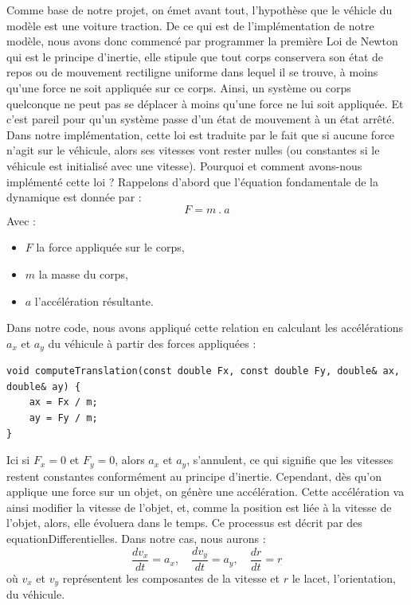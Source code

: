 Comme base de notre projet, on émet avant tout, l'hypothèse que le véhicle du modèle est une voiture traction.
De ce qui est de l'implémentation de notre modèle, nous avons donc commencé par programmer la première Loi de Newton qui est le principe d'inertie, elle stipule que tout corps conservera son état de repos ou de mouvement rectiligne uniforme dans lequel il se trouve, à moins qu'une force ne soit appliquée sur ce corps.
Ainsi, un système ou corps quelconque ne peut pas se déplacer à moins qu'une force ne lui soit appliquée.
Et c'est pareil pour qu'un système passe d'un état de mouvement à un état arrêté.
Dans notre implémentation, cette loi est traduite par le fait que si aucune force n'agit sur le véhicule, alors ses vitesses vont rester nulles (ou constantes si le véhicule est initialisé avec une vitesse).
Pourquoi et comment avons-nous implémenté cette loi ?
Rappelons d'abord que l'équation fondamentale de la dynamique est donnée par :
$$F = m \ .\  a$$
Avec :
\begin{itemize}
    \item $F$ la force appliquée sur le corps,
    \item $m$ la masse du corps,
    \item $a$ l'accélération résultante.
\end{itemize}

Dans notre code, nous avons appliqué cette relation en calculant les accélérations $a_x$ et $a_y$ du véhicule à partir des forces appliquées :


\begin{lstlisting}[style=CStyle,label={lst:void_computeTranslation}]
void computeTranslation(const double Fx, const double Fy, double& ax, double& ay) {
    ax = Fx / m;
    ay = Fy / m;
}
\end{lstlisting}

Ici si $F_x = 0$ et $F_y = 0$, alors $a_x$ et $a_y$, s'annulent, ce qui signifie que les vitesses restent constantes conformément au principe d'inertie.
Cependant, dès qu'on applique une force sur un objet, on génère une accélération.
Cette accélération va ainsi modifier la vitesse de l'objet, et, comme la position est liée à la vitesse de l'objet, alors, elle évoluera dans le temps.
Ce processus est décrit par des \glspl{equationDifferentielle}.
Dans notre cas, nous aurons :
$$\frac{d v_x}{dt} = a_x, \quad \frac{d v_y}{dt} = a_y, \quad \frac{d r}{dt} = r_{\dot{}}$$
où $v_x$ et $v_y$ représentent les composantes de la vitesse et $r$ le lacet, l'orientation, du véhicule.

